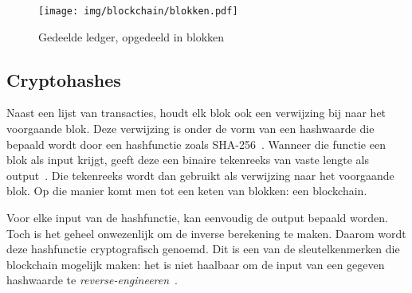 \begin{figure}[H]
	\centering
	\texttt{[image: img/blockchain/blokken.pdf]}
	\caption{\label{fig:blokken}Gedeelde ledger, opgedeeld in blokken}
\end{figure}

\subsection{Cryptohashes}
\label{sub:cryptohashes}

Naast een lijst van transacties, houdt elk blok ook een verwijzing bij naar het voorgaande blok. Deze verwijzing is onder de vorm van een hashwaarde die bepaald wordt door een hashfunctie zoals SHA-256~\autocite{Nakamoto2008}. Wanneer die functie een blok als input krijgt, geeft deze een binaire tekenreeks van vaste lengte als output~\autocite{Slaats2019}. Die tekenreeks wordt dan gebruikt als verwijzing naar het voorgaande blok. Op die manier komt men tot een keten van blokken: een blockchain.

\begin{center}
\end{center}

Voor elke input van de hashfunctie, kan eenvoudig de output bepaald worden. Toch is het geheel onwezenlijk om de inverse berekening te maken. Daarom wordt deze hashfunctie cryptografisch genoemd. Dit is een van de sleutelkenmerken die blockchain mogelijk maken: het is niet haalbaar om de input van een gegeven hashwaarde te \textit{reverse-engineeren}~\autocite{Mansfield2018}. 

